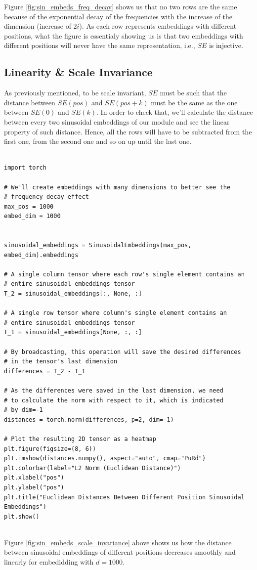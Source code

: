 \documentclass{article}
\begin{document}
Figure \ref{fig:sin_embeds_freq_decay} shows us that no two rows are the same because of the exponential decay of the frequencies with the increase of the dimension (increase of $2i$). As each row represents embeddings with different positions, what the figure is essentialy showing us is that two embeddings with different positions will never have the same representation, i.e., $SE$ is injective.

\subsection{Linearity \& Scale Invariance}

As previously mentioned, to be scale invariant, $SE$ must be such that the distance between $SE(pos)$ and $SE(pos + k)$ must be the same as the one between $SE(0)$ and $SE(k)$. In order to check that, we'll calculate the distance between every two sinusoidal embeddings of our module and see the linear property of such distance. Hence, all the rows will have to be subtracted from the first one, from the second one and so on up until the last one. 


\begin{lstlisting}[caption={Generating the plot of the module of the difference between every two different positions sinusoidal embeddings}]
	
import torch

# We'll create embeddings with many dimensions to better see the 
# frequency decay effect
max_pos = 1000
embed_dim = 1000


sinusoidal_embeddings = SinusoidalEmbeddings(max_pos, embed_dim).embeddings

# A single column tensor where each row's single element contains an 
# entire sinusoidal embeddings tensor
T_2 = sinusoidal_embeddings[:, None, :]

# A single row tensor where column's single element contains an 
# entire sinusoidal embeddings tensor
T_1 = sinusoidal_embeddings[None, :, :]

# By broadcasting, this operation will save the desired differences
# in the tensor's last dimension
differences = T_2 - T_1

# As the differences were saved in the last dimension, we need 
# to calculate the norm with respect to it, which is indicated 
# by dim=-1
distances = torch.norm(differences, p=2, dim=-1)

# Plot the resulting 2D tensor as a heatmap
plt.figure(figsize=(8, 6))
plt.imshow(distances.numpy(), aspect="auto", cmap="PuRd")
plt.colorbar(label="L2 Norm (Euclidean Distance)")
plt.xlabel("pos")
plt.ylabel("pos")
plt.title("Euclidean Distances Between Different Position Sinusoidal Embeddings")
plt.show()


\end{lstlisting}
Figure \ref{fig:sin_embeds_scale_invariance} above shows us how the distance between sinusoidal embeddings of different positions decreases smoothly and linearly for embedidding with $d = 1000$.
\end{document}
